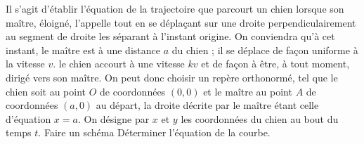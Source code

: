 \begin{Exercise}[title=La courbe du chien]
  Il s’agit d’établir l'équation de la trajectoire que parcourt un chien lorsque son maître, éloigné, l'appelle tout en se déplaçant sur une droite perpendiculairement au segment de droite les séparant à l’instant origine. On conviendra qu'à cet instant, le maître est à une distance $a$ du chien ; il se déplace de façon uniforme à la vitesse $v$. le chien accourt à une vitesse $kv$ et de façon à être, à tout moment, dirigé vers son maître. On peut donc choisir un repère orthonormé, tel que le chien soit au point $ O$ de coordonnées $(0,0)$ et le maître au point $A$ de coordonnées $(a,0)$ au départ, la droite décrite par le maître étant celle d’équation $x = a$. On désigne par $x$ et $y$ les coordonnées du chien au bout du temps $t$.
  \Question Faire un schéma
  \Question Déterminer l'équation de la courbe.
\end{Exercise}
